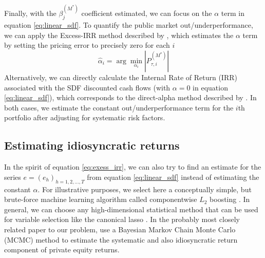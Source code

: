 \documentclass[12pt]{article}
\begin{document}
Finally, with the $\beta_j^{(M^*)}$ coefficient estimated, we can focus on the $\alpha$ term in equation \ref{eq:linear_sdf}.
To quantify the public market out/underperformance, we can apply the Excess-IRR method described by \cite{PG09}, which estimates the $\alpha$ term by setting the pricing error to precisely zero for each $i$
\begin{equation}
	\label{eq:exess_irr}
\hat{\alpha}_i = \arg \min_{\alpha_i} \left| P_{\tau, i}^{(M^*)}  \right|
\end{equation}
Alternatively, we can directly calculate the Internal Rate of Return (IRR) associated with the SDF discounted cash flows (with $\alpha=0$ in equation \ref{eq:linear_sdf}), which corresponds to the direct-alpha method described by \cite{GGS23}.
In both cases, we estimate the constant out/underperformance term for the $i$th portfolio after adjusting for systematic risk factors.

\subsection{Estimating idiosyncratic returns}
\label{sec:error_term_estimation}

In the spirit of equation \ref{eq:exess_irr}, we can also try to find an estimate for the series $e=(e_h)_{h=1,2,\dots,T}$ from equation \ref{eq:linear_sdf} instead of estimating the constant $\alpha$.
For illustrative purposes, we select here a conceptually simple, but brute-force machine learning algorithm called componentwise $L_2$ boosting \citep{B06}.
In general, we can choose any high-dimensional statistical method that can be used for variable selection like the canonical lasso \citep{BG11}.
In the probably most closely related paper to our problem, \cite{ACGP18} use a Bayesian Markov Chain Monte Carlo (MCMC) method to estimate the systematic and also idiosyncratic return component of private equity returns.
\end{document}
